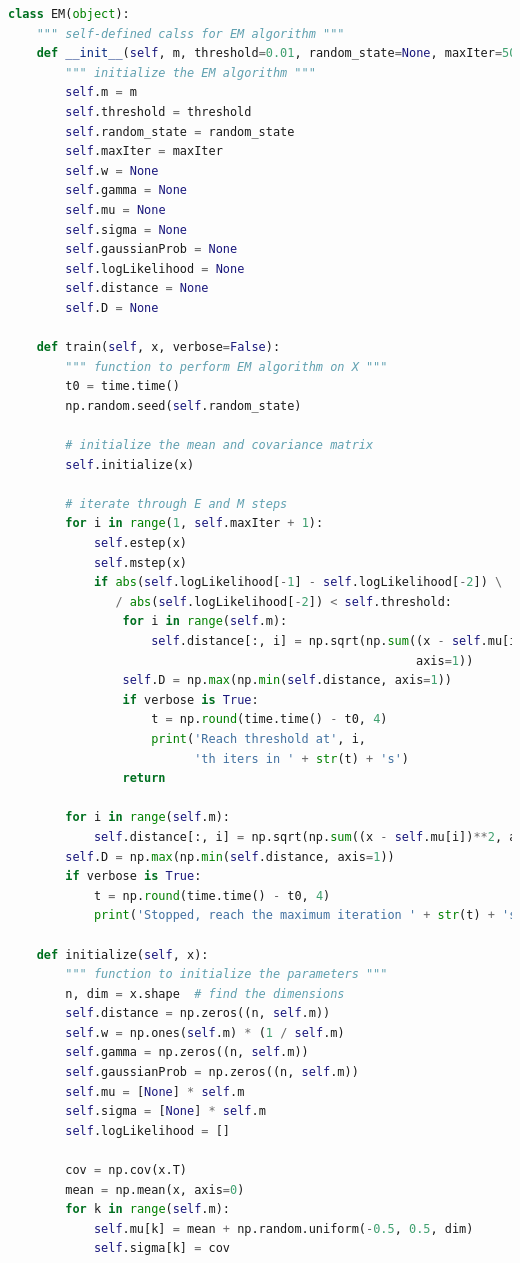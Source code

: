 \begin{description}
\begin{description}
\begin{lstlisting}[language=Python, caption=EM Algorithm Python Code]
class EM(object):
    """ self-defined calss for EM algorithm """
    def __init__(self, m, threshold=0.01, random_state=None, maxIter=500):
        """ initialize the EM algorithm """
        self.m = m
        self.threshold = threshold
        self.random_state = random_state
        self.maxIter = maxIter
        self.w = None
        self.gamma = None
        self.mu = None
        self.sigma = None
        self.gaussianProb = None
        self.logLikelihood = None
        self.distance = None
        self.D = None

    def train(self, x, verbose=False):
        """ function to perform EM algorithm on X """
        t0 = time.time()
        np.random.seed(self.random_state)

        # initialize the mean and covariance matrix
        self.initialize(x)

        # iterate through E and M steps
        for i in range(1, self.maxIter + 1):
            self.estep(x)
            self.mstep(x)
            if abs(self.logLikelihood[-1] - self.logLikelihood[-2]) \
               / abs(self.logLikelihood[-2]) < self.threshold:
                for i in range(self.m):
                    self.distance[:, i] = np.sqrt(np.sum((x - self.mu[i])**2,
                                                         axis=1))
                self.D = np.max(np.min(self.distance, axis=1))
                if verbose is True:
                    t = np.round(time.time() - t0, 4)
                    print('Reach threshold at', i,
                          'th iters in ' + str(t) + 's')
                return

        for i in range(self.m):
            self.distance[:, i] = np.sqrt(np.sum((x - self.mu[i])**2, axis=1))
        self.D = np.max(np.min(self.distance, axis=1))
        if verbose is True:
            t = np.round(time.time() - t0, 4)
            print('Stopped, reach the maximum iteration ' + str(t) + 's')

    def initialize(self, x):
        """ function to initialize the parameters """
        n, dim = x.shape  # find the dimensions
        self.distance = np.zeros((n, self.m))
        self.w = np.ones(self.m) * (1 / self.m)
        self.gamma = np.zeros((n, self.m))
        self.gaussianProb = np.zeros((n, self.m))
        self.mu = [None] * self.m
        self.sigma = [None] * self.m
        self.logLikelihood = []

        cov = np.cov(x.T)
        mean = np.mean(x, axis=0)
        for k in range(self.m):
            self.mu[k] = mean + np.random.uniform(-0.5, 0.5, dim)
            self.sigma[k] = cov


\end{lstlisting}
\end{description}
\end{description}
